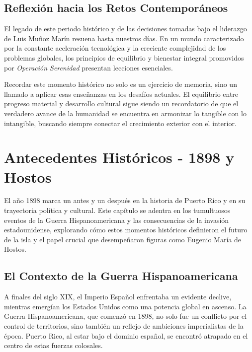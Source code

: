 \documentclass[
]{book}
\begin{document}
\section{Reflexión hacia los Retos Contemporáneos}\label{reflexiuxf3n-hacia-los-retos-contemporuxe1neos}

El legado de este periodo histórico y de las decisiones tomadas bajo el liderazgo de Luis Muñoz Marín resuena hasta nuestros días. En un mundo caracterizado por la constante aceleración tecnológica y la creciente complejidad de los problemas globales, los principios de equilibrio y bienestar integral promovidos por \emph{Operación Serenidad} presentan lecciones esenciales.

Recordar este momento histórico no solo es un ejercicio de memoria, sino un llamado a aplicar esas enseñanzas en los desafíos actuales. El equilibrio entre progreso material y desarrollo cultural sigue siendo un recordatorio de que el verdadero avance de la humanidad se encuentra en armonizar lo tangible con lo intangible, buscando siempre conectar el crecimiento exterior con el interior.

\chapter{Antecedentes Históricos - 1898 y Hostos}\label{antecedentes-histuxf3ricos---1898-y-hostos}

El año 1898 marca un antes y un después en la historia de Puerto Rico y en su trayectoria política y cultural. Este capítulo se adentra en los tumultuosos eventos de la Guerra Hispanoamericana y las consecuencias de la invasión estadounidense, explorando cómo estos momentos históricos definieron el futuro de la isla y el papel crucial que desempeñaron figuras como Eugenio María de Hostos.

\section{El Contexto de la Guerra Hispanoamericana}\label{el-contexto-de-la-guerra-hispanoamericana}

A finales del siglo XIX, el Imperio Español enfrentaba un evidente declive, mientras emergían los Estados Unidos como una potencia global en ascenso. La Guerra Hispanoamericana, que comenzó en 1898, no solo fue un conflicto por el control de territorios, sino también un reflejo de ambiciones imperialistas de la época. Puerto Rico, al estar bajo el dominio español, se encontró atrapado en el centro de estas fuerzas colosales.
\end{document}
